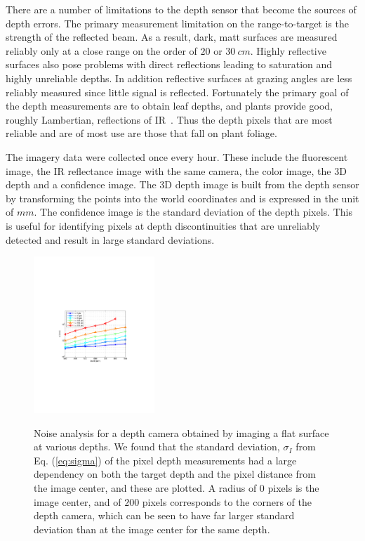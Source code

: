 There are a number of limitations to the depth sensor that become the sources of depth errors. 
The primary measurement limitation on the range-to-target is the strength of the reflected beam. 
As a result, dark, matt surfaces are measured reliably only at a close range on the order of $20$ or $30~cm$.  
Highly reflective surfaces also pose problems with direct reflections leading to saturation and highly unreliable depths.  
In addition reflective surfaces at grazing angles are less reliably measured since little signal is reflected. 
Fortunately the primary goal of the depth measurements are to obtain leaf depths, and plants provide good, roughly Lambertian, reflections of IR~\cite{Chelle2006219}.  Thus the depth pixels that are most reliable and are of most use are those that fall on plant foliage.

The imagery data were collected once every hour.
These include the fluorescent image, the IR reflectance image with the same camera, the color image, the $3$D depth and a confidence image.  
The $3$D depth image is built from the depth sensor by transforming the points into the world coordinates and is expressed in the unit of $mm$.  
The confidence image is the standard deviation of the depth pixels.  
This is useful for identifying pixels at depth discontinuities that are unreliably detected and result in large standard deviations.  


\begin{figure}
\centering
  \includegraphics[height=5.9cm,trim=110 250 60 260,clip]{Figures/SigmaRadius} \\
\caption{Noise analysis for a depth camera obtained by imaging a flat surface at various depths.  We found that the standard deviation, $\sigma_I$ from Eq. (\ref{eq:sigma}) of the pixel depth measurements had a large dependency on both the target depth and the pixel distance from the image center, and these are plotted.  A radius of $0$ pixels is the image center, and of $200$ pixels corresponds to the corners of the depth camera, which can be seen to have far larger standard deviation than at the image center for the same depth. }
\label{fig:Noise}
\end{figure}

